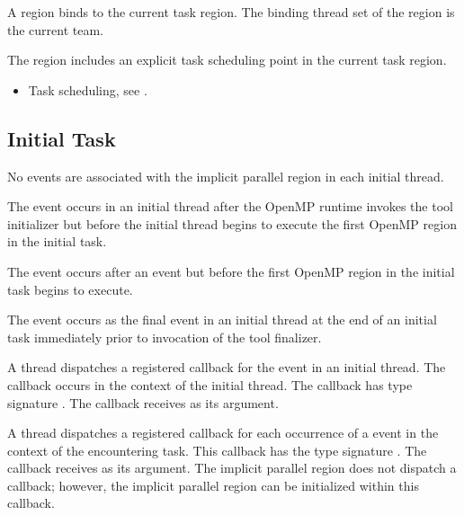 \binding
A  region binds to the current task region. The binding thread set of the
 region is the current team.

\descr
The  region includes an explicit task scheduling point in the current task
region.

\crossreferences
\begin{itemize}
\item Task scheduling, see
.
\end{itemize}











\subsection{Initial Task}

\events
No events are associated with the implicit parallel region in each initial thread.

The  event occurs in an initial thread after the OpenMP runtime invokes the tool initializer
but before the initial thread begins to execute the first OpenMP region in the initial task.

The  event occurs after an  event
but before the first OpenMP region in the initial task begins to execute.

The  event occurs as the final event in an initial thread at the end of an initial task
immediately prior to invocation of the tool finalizer.

\tools

A thread dispatches a registered 
callback for the  event in an initial thread.
The callback occurs in the context of the initial thread.
The callback has type signature .
The callback receives  as its  argument.

A thread dispatches a registered 
callback for each occurrence of a  event
in the context of the encountering task.  This callback has the type signature
.
The callback receives  as its  argument.
The implicit parallel region does not dispatch a  callback;
however, the implicit parallel region can be initialized within this 
callback.

